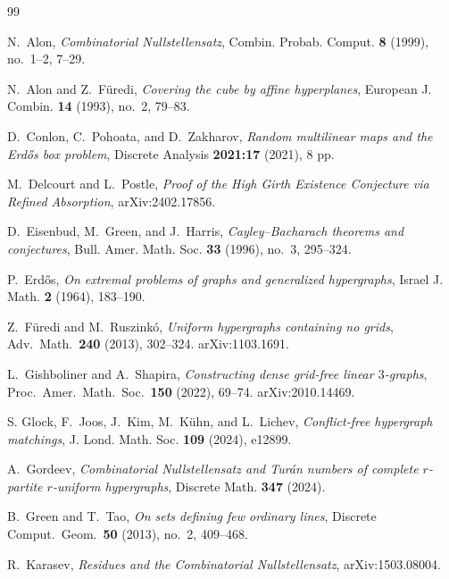 \documentclass[11pt]{article}
\theoremstyle{definition}
\theoremstyle{remark}
\begin{document}
\begin{thebibliography}{99}

N.~Alon,
\emph{Combinatorial Nullstellensatz},
Combin. Probab. Comput. \textbf{8} (1999), no.~1--2, 7--29.

N.~Alon and Z.~F\"uredi,
\emph{Covering the cube by affine hyperplanes},
European J. Combin. \textbf{14} (1993), no.~2, 79--83.

D.~Conlon, C.~Pohoata, and D.~Zakharov,
\newblock \emph{Random multilinear maps and the Erd\H{o}s box problem},
\newblock Discrete Analysis \textbf{2021:17} (2021), 8 pp.

 M.~Delcourt and L.~Postle,
\emph{Proof of the High Girth Existence Conjecture via Refined Absorption}, 
\newblock arXiv:2402.17856.

D.~Eisenbud, M.~Green, and J.~Harris,
\emph{Cayley--Bacharach theorems and conjectures},
Bull. Amer. Math. Soc. \textbf{33} (1996), no.~3, 295--324.

P.~Erd\H{o}s,
\emph{On extremal problems of graphs and generalized hypergraphs}, Israel J. Math. \textbf{2} (1964), 183--190.

Z.~F\"uredi and M.~Ruszink\'o,
\newblock \emph{Uniform hypergraphs containing no grids},
\newblock Adv.\ Math.\ \textbf{240} (2013), 302--324.
\newblock arXiv:1103.1691.

L.~Gishboliner and A.~Shapira,
\newblock \emph{Constructing dense grid-free linear $3$-graphs},
\newblock Proc.\ Amer.\ Math.\ Soc.\ \textbf{150} (2022), 69--74.
\newblock arXiv:2010.14469.

S. Glock, F.~Joos, J.~Kim, M.~K{\"u}hn, and L.~Lichev,
\emph{Conflict-free hypergraph matchings},
J. Lond. Math. Soc. \textbf{109} (2024), e12899.

A.~Gordeev,
\emph{Combinatorial Nullstellensatz and Turán numbers of complete $r$-partite $r$-uniform hypergraphs},
Discrete Math. \textbf{347} (2024).

B.~Green and T.~Tao,
\newblock \emph{On sets defining few ordinary lines},
\newblock Discrete Comput.\ Geom.\ \textbf{50} (2013), no.~2, 409--468.

R.~Karasev,
\newblock \emph{Residues and the Combinatorial Nullstellensatz},
\newblock arXiv:1503.08004.


\end{thebibliography}
\end{document}
